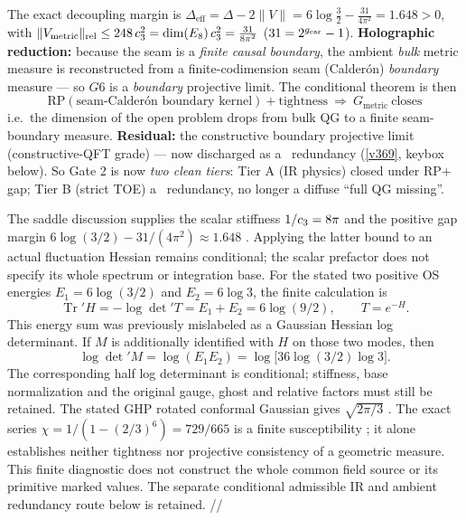 \begin{keybox}
The exact decoupling margin is $\Delta_{\mathrm{eff}}=\Delta-2\|V\|=6\log\tfrac32-\tfrac{31}{4\pi^2}=1.648>0$,
with $\|V_{\mathrm{metric}}\|_{\mathrm{rel}}\le248\,c_3^2=\dim(E_8)\,c_3^2=\tfrac{31}{8\pi^2}$
($31=2^{g_{\mathrm{car}}}-1$). \textbf{Holographic reduction:} because the seam is a \emph{finite causal boundary}, the
ambient \emph{bulk} metric measure is reconstructed from a finite-codimension seam (Calder\'on) \emph{boundary}
measure --- so $G6$ is a \emph{boundary} projective limit. The conditional theorem is then
\[
  \boxed{\ \mathrm{RP}(\text{seam-Calder\'on boundary kernel})+\text{tightness}\ \Longrightarrow\ G_{\mathrm{metric}}\ \text{closes}\ }
\]
i.e.\ the dimension of the open problem drops from bulk QG to a finite seam-boundary measure. \textbf{Residual:}
the constructive boundary projective limit (constructive-QFT grade) --- now discharged as a \mC\ redundancy
(\vref{v369}, keybox below). So Gate 2 is now
\emph{two clean tiers}: Tier A (IR physics) closed under RP$+$gap; Tier B (strict TOE) a \mC\ redundancy, no
longer a diffuse ``full QG missing''. \mC
\end{keybox}

\begin{keybox}
The saddle discussion supplies the scalar stiffness $1/c_3=8\pi$ and the
positive gap margin $6\log(3/2)-31/(4\pi^2)\approx1.648$ \mE.
Applying the latter bound to an actual fluctuation Hessian remains conditional;
the scalar prefactor does not specify its whole spectrum or integration base.
For the stated two positive OS energies
$E_1=6\log(3/2)$ and $E_2=6\log3$, the finite calculation is
\[
  \operatorname{Tr}'H=-\log\det'T=E_1+E_2=6\log(9/2),\qquad T=e^{-H}.
\]
This energy sum was previously mislabeled as a Gaussian Hessian log determinant.
If $M$ is additionally identified with $H$ on those two modes, then \mC
\[
  \log\det'M=\log(E_1E_2)=\log\!\bigl[36\log(3/2)\log3\bigr].
\]
The corresponding half log determinant is conditional; stiffness, base normalization
and the original gauge, ghost and relative factors must still be retained.
The stated GHP rotated conformal Gaussian gives $\sqrt{2\pi/3}$ \mC.
The exact series $\chi=1/(1-(2/3)^6)=729/665$ is a finite susceptibility \mE;
it alone establishes neither tightness nor projective consistency of a geometric measure.
This finite diagnostic does not construct the whole common field source or its
primitive marked values. The separate conditional admissible IR and ambient
redundancy route below is retained. \mE/\mC/\mO
\end{keybox}

